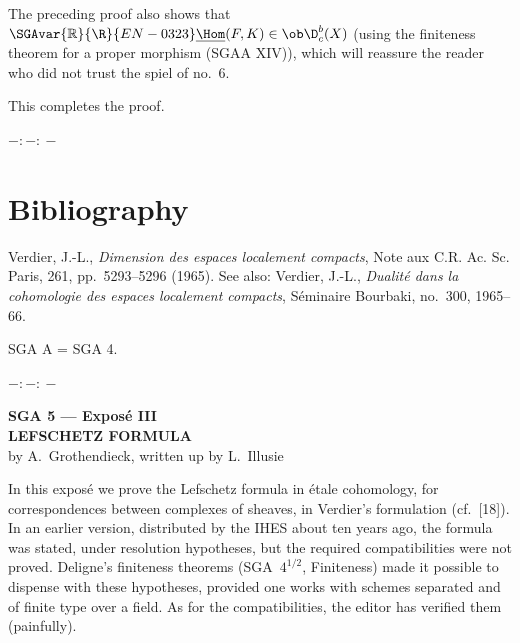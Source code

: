 The preceding proof also shows that $\SGAvar{\mathbb{R}}{\R}{EN-0323}\underline{\Hom}(F,K)\in\ob\D_c^b(X)$ (using the finiteness theorem for a proper morphism (SGAA XIV)), which will reassure the reader who did not trust the spiel of no.~6.

This completes the proof.

\begin{center}
$-:\!-:\!-$
\end{center}

\section*{Bibliography}

\begin{enumerate}[label={[\arabic*]}]
\item Verdier, J.-L., \emph{Dimension des espaces localement compacts}, Note aux C.R. Ac. Sc. Paris, 261, pp.~5293--5296 (1965). See also: Verdier, J.-L., \emph{Dualité dans la cohomologie des espaces localement compacts}, Séminaire Bourbaki, no.~300, 1965--66.
\end{enumerate}

SGA A = SGA 4.

\begin{center}
$-:\!-:\!-$
\end{center}

\clearpage
\begin{center}
{\Large \textbf{SGA 5 --- Exposé III}}\\[0.4em]
{\large \textbf{LEFSCHETZ FORMULA}}\\[0.3em]
by A.~Grothendieck, written up by L.~Illusie
\end{center}

In this exposé we prove the Lefschetz formula in étale cohomology, for correspondences between complexes of sheaves, in Verdier's formulation (cf.~[18]). In an earlier version, distributed by the IHES about ten years ago, the formula was stated, under resolution hypotheses, but the required compatibilities were not proved. Deligne's finiteness theorems (SGA~$4^{1/2}$, Finiteness) made it possible to dispense with these hypotheses, provided one works with schemes separated and of finite type over a field. As for the compatibilities, the editor has verified them (painfully).

